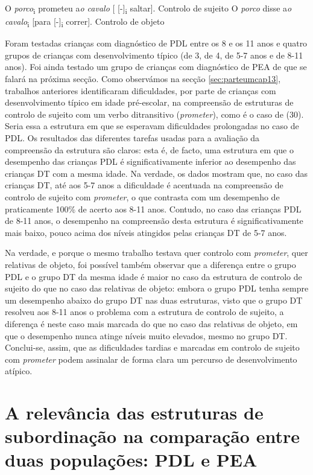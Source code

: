 \documentclass[output=paper,colorlinks,citecolor=brown,booklanguage=portuguese]{langscibook}
\begin{document}
\ea
    \label{ex:13:30} O \emph{porco}\textsubscript{i} prometeu a\emph{o cavalo} [ [-]\textsubscript{i}  saltar]. \hfill Controlo de sujeito
    \z
    \ea
\label{ex:13:31} O \emph{porco} disse a\emph{o cavalo}\textsubscript{i} [para [-]\textsubscript{i} correr]. \hfill Controlo de objeto
\z

Foram testadas crianças com diagnóstico de PDL entre os 8 e os 11 anos e quatro grupos de crianças com desenvolvimento típico (de 3, de 4, de 5-7 anos e de 8-11 anos). Foi ainda testado um grupo de crianças com diagnóstico de PEA de que se falará na próxima secção. Como observámos na secção \ref{sec:parteumcap13}, trabalhos anteriores identificaram dificuldades, por parte de crianças com desenvolvimento típico em idade pré-escolar, na compreensão de estruturas de controlo de sujeito com um verbo ditransitivo (\emph{prometer}), como é o caso de (30). Seria essa a estrutura em que se esperavam dificuldades prolongadas no caso de PDL. Os resultados das diferentes tarefas usadas para a avaliação da compreensão da estrutura são claros: esta é, de facto, uma estrutura em que o desempenho das crianças PDL é significativamente inferior ao desempenho das crianças DT com a mesma idade. Na verdade, os dados mostram que, no caso das crianças DT, até aos 5-7 anos a dificuldade é acentuada na compreensão de controlo de sujeito com \emph{prometer}, o que contrasta com um desempenho de praticamente 100\% de acerto aos 8-11 anos. Contudo, no caso das crianças PDL de 8-11 anos, o desempenho na compreensão desta estrutura é significativamente mais baixo, pouco acima dos níveis atingidos pelas crianças DT de 5-7 anos. 

Na verdade, e porque o mesmo trabalho testava quer controlo com \emph{prometer}, quer relativas de objeto, foi possível também observar que a diferença entre o grupo PDL e o grupo DT da mesma idade é maior no caso da estrutura de controlo de sujeito do que no caso das relativas de objeto: embora o grupo PDL tenha sempre um desempenho abaixo do grupo DT nas duas estruturas, visto que o grupo DT resolveu aos 8-11 anos o problema com a estrutura de controlo de sujeito, a diferença é neste caso mais marcada do que no caso das relativas de objeto, em que o desempenho nunca atinge níveis muito elevados, mesmo no grupo DT. Conclui-se, assim, que as dificuldades tardias e marcadas em controlo de sujeito com \emph{prometer} podem assinalar de forma clara um percurso de desenvolvimento atípico. 

\section{A relevância das estruturas de subordinação na comparação entre duas populações: PDL e PEA}
\end{document}

